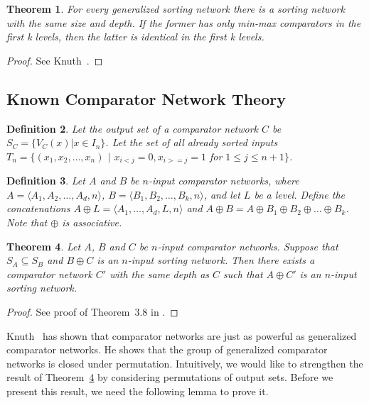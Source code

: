 \documentclass[13pt,a4paper]{article}
\newtheorem{theorem}{Theorem}[section]
\newtheorem{definition}[theorem]{Definition}
\begin{document}
\begin{theorem}
\label{FloydKnuthGeneralizedTheorem}
For every generalized sorting network there is a sorting network with the same size and depth. If the former has only min-max comparators in the first k levels, then the latter is identical in the first k levels.
\end{theorem}

\begin{proof}
See Knuth~\cite{Knuth73}.
\end{proof}


\subsection{Known Comparator Network Theory}
\label{sec:background:theory:overlap}

\begin{definition}
\label{OutputSetDefinition}
Let the \emph{output set} of a comparator network $C$ be $S_C = \{ V_C(x) \lvert x \in I_n \}$. Let the set of all already sorted inputs $T_n = \{ (x_1, x_2, \dots, x_n)$ $\lvert$  $x_{i < j} = 0, x_{i >= j} = 1$ for $ 1 \leq j \leq n + 1 \}$.
\end{definition}

\begin{definition}
\label{ComparatorNetworkUnionLevelDefinition}
Let $A$ and $B$ be $n$-input comparator networks, where $A = \langle A_1, A_2, \dots, A_d, n \rangle $, $B = \langle B_1, B_2, \dots, B_k, n \rangle $, and let $L$ be a level. Define the concatenations $A \oplus L = \langle A_1, \dots, A_d, L, n \rangle $ and $A \oplus B = A \oplus B_1 \oplus B_2 \oplus \dots \oplus B_k$. Note that $\oplus$ is associative.
\end{definition}

\begin{theorem}
\label{MinimalOutputSetTheorem}
Let $A$, $B$ and $C$ be $n$-input comparator networks. Suppose that $S_{A} \subseteq S_{B}$ and $B \oplus C$ is an $n$-input sorting network. Then there exists a comparator network $C'$ with the same depth as $C$ such that $A \oplus C'$ is an $n$-input sorting network.
\end{theorem}

\begin{proof}
See proof of Theorem~3.8 in \cite{Marinov:SortingNetworks:ThirdLevel}.
\end{proof}

Knuth~\cite{Knuth73} has shown that comparator networks are just as powerful as generalized comparator networks. He shows that the group of generalized comparator networks is closed under permutation. Intuitively, we would like to strengthen the result of Theorem~\ref{MinimalOutputSetTheorem} by considering permutations of output sets. Before we present this result, we need the following lemma to prove it.
\end{document}
